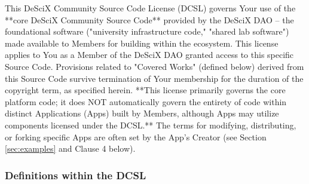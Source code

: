 \documentclass{article}
\begin{document}
This DeSciX Community Source Code License (DCSL) governs Your use of the **core DeSciX Community Source Code** provided by the DeSciX DAO – the foundational software ("university infrastructure code," "shared lab software") made available to Members for building within the ecosystem. This license applies to You as a Member of the DeSciX DAO granted access to this specific Source Code. Provisions related to "Covered Works" (defined below) derived from this Source Code survive termination of Your membership for the duration of the copyright term, as specified herein. **This license primarily governs the core platform code; it does NOT automatically govern the entirety of code within distinct Applications (Apps) built by Members, although Apps may utilize components licensed under the DCSL.** The terms for modifying, distributing, or forking specific Apps are often set by the App's Creator (see Section \ref{sec:examples} and Clause 4 below).

\subsubsection*{Definitions within the DCSL}
\end{document}
